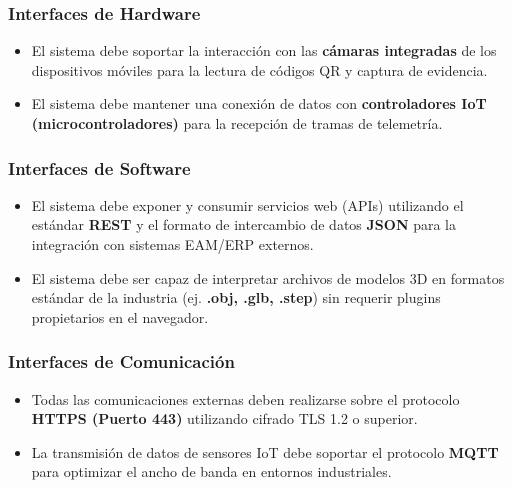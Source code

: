 \subsubsection{Interfaces de Hardware}
\begin{itemize}
    \item El sistema debe soportar la interacción con las \textbf{cámaras integradas} de los dispositivos móviles para la lectura de códigos QR y captura de evidencia.
    \item El sistema debe mantener una conexión de datos con \textbf{controladores IoT (microcontroladores)} para la recepción de tramas de telemetría.
\end{itemize}

\subsubsection{Interfaces de Software}
\begin{itemize}
    \item El sistema debe exponer y consumir servicios web (APIs) utilizando el estándar \textbf{REST} y el formato de intercambio de datos \textbf{JSON} para la integración con sistemas EAM/ERP externos.
    \item El sistema debe ser capaz de interpretar archivos de modelos 3D en formatos estándar de la industria (ej. \textbf{.obj, .glb, .step}) sin requerir plugins propietarios en el navegador.
\end{itemize}

\subsubsection{Interfaces de Comunicación}
\begin{itemize}
    \item Todas las comunicaciones externas deben realizarse sobre el protocolo \textbf{HTTPS (Puerto 443)} utilizando cifrado TLS 1.2 o superior.
    \item La transmisión de datos de sensores IoT debe soportar el protocolo \textbf{MQTT} para optimizar el ancho de banda en entornos industriales.
\end{itemize}


